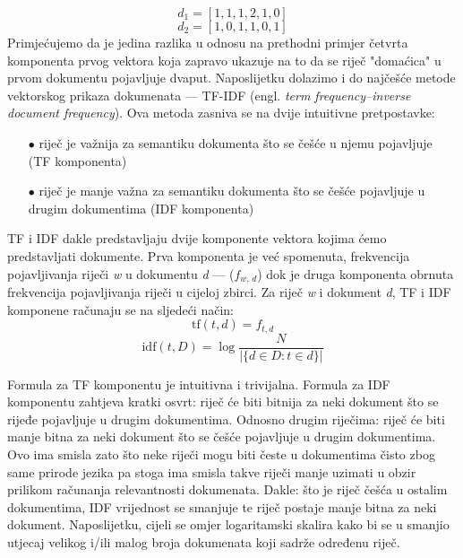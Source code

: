 \documentclass[times, utf8, zavrsni]{fer}
\begin{document}
\begin{equation}
{{d_{1}}=[1, 1, 1, 2, 1, 0]}
\end{equation}
\begin{equation}
{{d_{2}}=[1, 0, 1, 1, 0, 1]}
\end{equation}
Primjećujemo da je jedina razlika u odnosu na prethodni primjer četvrta komponenta prvog vektora koja zapravo ukazuje na to da se riječ "domaćica" u prvom dokumentu pojavljuje dvaput.
Naposlijetku dolazimo i do najčešće metode vektorskog prikaza dokumenata — TF-IDF (engl. \textit{term frequency–inverse document frequency}). Ova metoda zasniva se na dvije intuitivne pretpostavke:
\begin{itemize}
\item[$\bullet$] riječ je važnija za semantiku dokumenta što se češće u njemu pojavljuje (TF komponenta)
\item[$\bullet$] riječ je manje važna za semantiku dokumenta što se češće pojavljuje u drugim dokumentima (IDF komponenta)
\end{itemize}
TF i IDF dakle predstavljaju dvije komponente vektora kojima ćemo predstavljati dokumente. Prva komponenta je već spomenuta, frekvencija pojavljivanja riječi \textit{w} u dokumentu \textit{d} — ($f_\textit{w, d}$) dok je druga komponenta obrnuta frekvencija pojavljivanja riječi u cijeloj zbirci.
Za riječ \textit{w} i dokument \textit{d}, TF i IDF komponene računaju se na sljedeći način:
\begin{equation}
{\displaystyle \mathrm {tf} (t,d)=f_{t,d}}
\end{equation}
\begin{equation}
{\displaystyle \mathrm {idf} (t,D)=\log {\frac {N}{|\{d\in D:t\in d\}|}}}
\end{equation}

Formula za TF komponentu je intuitivna i trivijalna. Formula za IDF komponentu zahtjeva kratki osvrt: riječ će biti bitnija za neki dokument što se rijeđe pojavljuje u drugim dokumentima. Odnosno drugim riječima: riječ će biti manje bitna za neki dokument što se češće pojavljuje u drugim dokumentima. Ovo ima smisla zato što neke riječi mogu biti česte u dokumentima čisto zbog same prirode jezika pa stoga ima smisla takve riječi manje uzimati u obzir prilikom računanja relevantnosti dokumenata. Dakle: što je riječ češća u ostalim dokumentima, IDF vrijednost se smanjuje te riječ postaje manje bitna za neki dokument. Naposlijetku, cijeli se omjer logaritamski skalira kako bi se u smanjio utjecaj velikog i/ili malog broja dokumenata koji sadrže određenu riječ.
\end{document}
